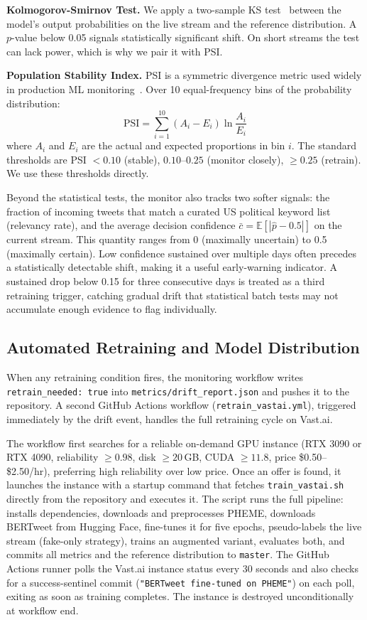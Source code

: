 \documentclass[sigconf]{acmart}
\begin{document}
\textbf{Kolmogorov-Smirnov Test.} We apply a two-sample KS test~\cite{massey1951kolmogorov}
between the model's output probabilities on the live stream and the reference distribution.
A $p$-value below 0.05 signals statistically significant shift. On short streams the test
can lack power, which is why we pair it with PSI.

\textbf{Population Stability Index.} PSI is a symmetric divergence metric used widely in
production ML monitoring~\cite{yurdakul2018statistical}. Over 10 equal-frequency bins
of the probability distribution:
\[
  \mathrm{PSI} = \sum_{i=1}^{10} \left( A_i - E_i \right) \ln\!\frac{A_i}{E_i}
\]
where $A_i$ and $E_i$ are the actual and expected proportions in bin $i$. The standard
thresholds are PSI $< 0.10$ (stable), $0.10$--$0.25$ (monitor closely), $\geq 0.25$
(retrain). We use these thresholds directly.

Beyond the statistical tests, the monitor also tracks two softer signals: the fraction of
incoming tweets that match a curated US political keyword list (relevancy rate), and the
average decision confidence $\bar{c} = \mathbb{E}[|\hat{p} - 0.5|]$ on the current stream.
This quantity ranges from 0 (maximally uncertain) to 0.5 (maximally certain). Low confidence
sustained over multiple days often precedes a statistically detectable shift, making it
a useful early-warning indicator. A sustained drop below 0.15 for three consecutive days
is treated as a third retraining trigger, catching gradual drift that statistical batch
tests may not accumulate enough evidence to flag individually.

\subsection{Automated Retraining and Model Distribution}
\label{sec:auto_retrain}

When any retraining condition fires, the monitoring workflow writes
\texttt{retrain\_needed: true} into \texttt{metrics/drift\_report.json} and pushes it to
the repository. A second GitHub Actions workflow (\texttt{retrain\_vastai.yml}), triggered
immediately by the drift event, handles the full retraining cycle on Vast.ai.

The workflow first searches for a reliable on-demand GPU instance (RTX 3090 or RTX 4090,
reliability $\geq 0.98$, disk $\geq 20$\,GB, CUDA $\geq 11.8$, price \$0.50--\$2.50/hr),
preferring high reliability over low price. Once an offer is found, it launches the instance
with a startup command that fetches \texttt{train\_vastai.sh} directly from the repository
and executes it. The script runs the full pipeline: installs dependencies, downloads and
preprocesses PHEME, downloads BERTweet from Hugging Face, fine-tunes it for five epochs,
pseudo-labels the live stream (fake-only strategy), trains an augmented variant, evaluates
both, and commits all metrics and the reference distribution to \texttt{master}. The GitHub
Actions runner polls the Vast.ai instance status every 30 seconds and also checks for a
success-sentinel commit (\texttt{"BERTweet fine-tuned on PHEME"}) on each poll, exiting as
soon as training completes. The instance is destroyed unconditionally at workflow end.
\end{document}
